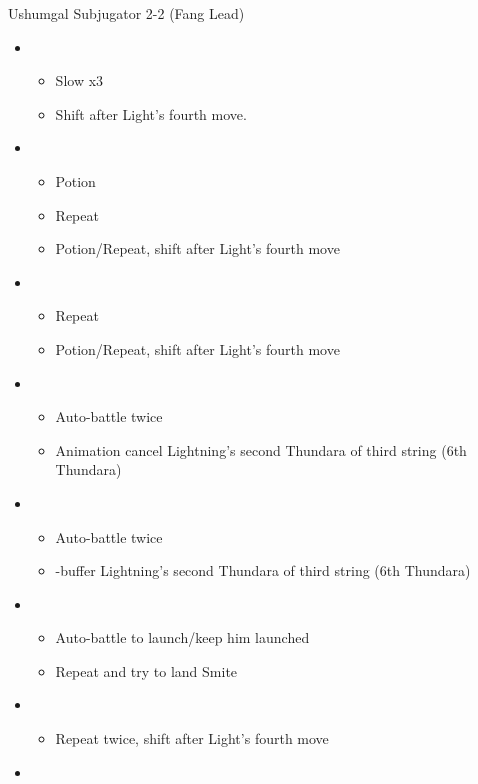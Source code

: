 \begin{multicols}{2}
\begin{battle}{Ushumgal Subjugator 2-2 (Fang Lead)}
\begin{itemize}
    \item \third
    \begin{itemize}
        \item Slow x3
        \item Shift after Light's fourth move.
    \end{itemize}
    \item \fifth
    \begin{itemize}
        \item Potion
        \item Repeat
        \item Potion/Repeat, shift after Light's fourth move
    \end{itemize}
    \item \third
    \begin{itemize}
        \item Repeat
        \item Potion/Repeat, shift after Light's fourth move
    \end{itemize}
    \item \second
    \begin{itemize}
        \item Auto-battle twice
        \item Animation cancel Lightning's second Thundara of third string (6th Thundara)
    \end{itemize}
    \item \sixth
    \begin{itemize}
        \item Auto-battle twice
        \item \com-buffer Lightning's second Thundara of third string (6th Thundara)
    \end{itemize}
    \item \first
    \begin{itemize}
        \item Auto-battle to launch/keep him launched
        \item Repeat and try to land Smite
    \end{itemize}
    \item \third
    \begin{itemize}
        \item Repeat twice, shift after Light's fourth move
    \end{itemize}
    \item \fourth

\end{itemize}
\end{battle}
\end{multicols}
